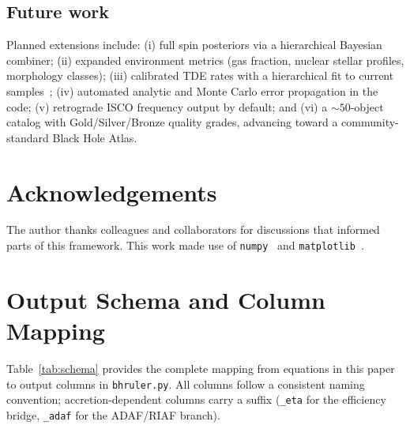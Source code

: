 \documentclass[11pt]{article}
\begin{document}
\subsection{Future work}

Planned extensions include:
(i) full spin posteriors via a hierarchical Bayesian combiner;
(ii) expanded environment metrics (gas fraction, nuclear stellar profiles, morphology classes);
(iii) calibrated TDE rates with a hierarchical fit to current samples~\cite{Stone2016,vanVelzen2020,French2020};
(iv) automated analytic and Monte Carlo error propagation in the code;
(v) retrograde ISCO frequency output by default;
and (vi) a $\sim 50$-object catalog with Gold/Silver/Bronze quality grades, advancing toward a community-standard Black Hole Atlas.


\section*{Acknowledgements}
The author thanks colleagues and collaborators for discussions that informed parts of this framework.
This work made use of \texttt{numpy}~\cite{numpy2020} and \texttt{matplotlib}~\cite{matplotlib2007}.


\appendix
\section{Output Schema and Column Mapping}\label{app:schema}

Table~\ref{tab:schema} provides the complete mapping from equations in this paper to output columns in \texttt{bhruler.py}.
All columns follow a consistent naming convention; accretion-dependent columns carry a suffix (\texttt{\_eta} for the efficiency bridge, \texttt{\_adaf} for the ADAF/RIAF branch).
\end{document}
